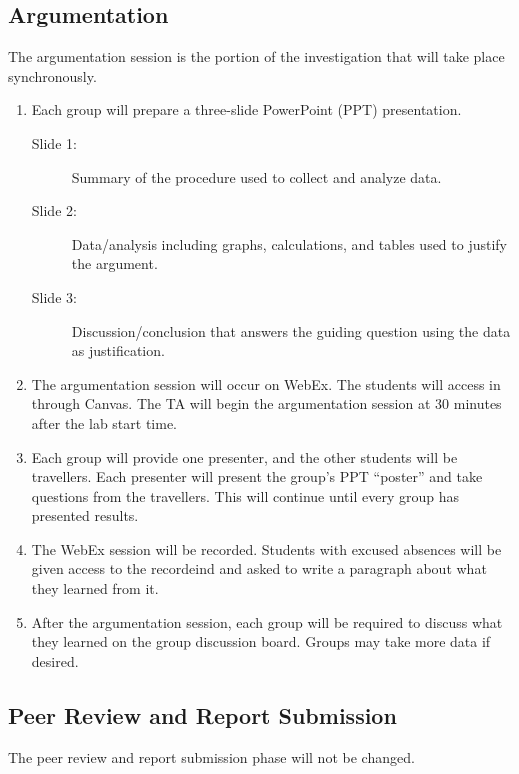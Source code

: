\documentclass[11pt, oneside]{article}
\begin{document}
\subsection{Argumentation}

The argumentation session is the portion of the investigation that will take place synchronously.

\begin{enumerate}
\item Each group will prepare a three-slide PowerPoint (PPT) presentation.
    \begin{description} 
    \item[Slide 1:] Summary of the procedure used to collect and analyze data.  
    \item[Slide 2:] Data/analysis including graphs, calculations, and tables used to justify the argument.  
    \item[Slide 3:] Discussion/conclusion that answers the guiding question using the data as justification.
    \end{description}

\item The argumentation session will occur on WebEx. The students will access in through Canvas.  The TA will begin the argumentation session at 30 minutes after the lab start time.

\item Each group will provide one presenter, and the other students will be travellers.  Each presenter will present the group's PPT ``poster'' and take questions from the travellers. This will continue until every group has presented results.

\item The WebEx session will be recorded.  Students with excused absences will be given access to the recordeind and asked to write a paragraph about what they learned from it.

\item After the argumentation session, each group will be required to discuss what they learned on the group discussion board.  Groups may take more data if desired.
\end{enumerate}

\subsection{Peer Review and Report Submission}

The peer review and report submission phase will not be changed.
\end{document}
